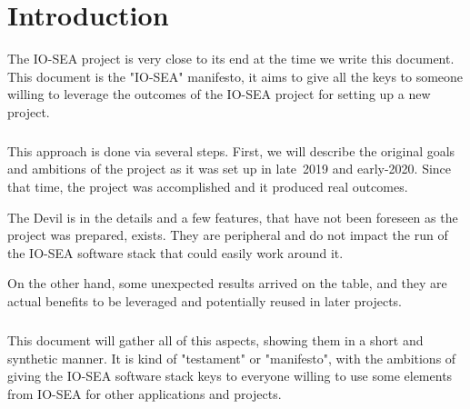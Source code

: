 \chapter{Introduction}\label{sec:introduction}
%

The IO-SEA project is very close to its end at the time we write this document. This document is the "IO-SEA" 
manifesto, it aims to give all the keys to someone willing to leverage the outcomes of the IO-SEA project for
setting up a new project.

\paragraph{}
This approach is done via several steps. First, we will describe the original goals and ambitions of the project
as it was set up in late~2019 and early-2020. Since that time, the project was accomplished and it produced real
outcomes. 

The Devil is in the details and a few features, that have not been foreseen as the project was prepared, exists. 
They are peripheral and do not impact the run of the IO-SEA software stack that could easily work around it. 

On the other hand, some unexpected results arrived on the table, and they are actual benefits to be leveraged
and potentially reused in later projects. 

\paragraph{}
This document will gather all of this aspects, showing them in a short and synthetic manner. It is kind of 
"testament" or "manifesto", with the ambitions of giving the IO-SEA software stack keys to everyone willing
to use some elements from IO-SEA for other applications and projects. 